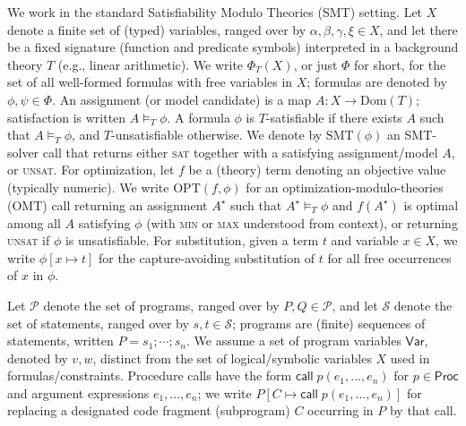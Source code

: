 \documentclass[acmsmall,screen,nonacm]{acmart}
\theoremstyle{definition}
\begin{document}
We work in the standard Satisfiability Modulo Theories (SMT) setting. Let $X$ denote a finite set of (typed) variables, ranged over by $\alpha,\beta,\gamma,\xi\in X$, and let there be a fixed signature (function and predicate symbols) interpreted in a background theory $T$ (e.g., linear arithmetic).
We write $\Phi_{T}(X)$, or just $\Phi$ for short, for the set of all well-formed formulas with free variables in $X$; formulas are denoted by $\phi,\psi\in \Phi$.
An assignment (or model candidate) is a map $A: X \to \mathrm{Dom}(T)$; satisfaction is written $A \models_T \phi$.
A formula $\phi$ is $T$-satisfiable if there exists $A$ such that $A \models_T \phi$, and $T$-unsatisfiable otherwise.
We denote by $\mathrm{SMT}(\phi)$ an SMT-solver call that returns either \textsc{sat} together with a satisfying assignment/model $A$, or \textsc{unsat}.
For optimization, let $f$ be a (theory) term denoting an objective value (typically numeric). We write $\mathrm{OPT}(f,\phi)$ for an optimization-modulo-theories (OMT) call returning an assignment $A^\star$ such that $A^\star \models_T \phi$ and $f(A^\star)$ is optimal among all $A$ satisfying $\phi$ (with \textsc{min} or \textsc{max} understood from context), or returning \textsc{unsat} if $\phi$ is unsatisfiable.
For substitution, given a term $t$ and variable $x\in X$, we write $\phi[x\mapsto t]$ for the capture-avoiding substitution of $t$ for all free occurrences of $x$ in $\phi$.

Let $\mathcal{P}$ denote the set of programs, ranged over by $P,Q\in\mathcal{P}$, and let $\mathcal{S}$ denote the set of statements, ranged over by $s,t\in\mathcal{S}$; programs are (finite) sequences of statements, written $P = s_1;\cdots;s_n$. We assume a set of program variables $\mathsf{Var}$, denoted by $v,w$, distinct from the set of logical/symbolic variables $X$ used in formulas/constraints. Procedure calls have the form $\mathsf{call}\;p(e_1, ..., e_n)$ for $p\in\mathsf{Proc}$ and argument expressions $e_1, ..., e_n$; we write $P[C \mapsto \mathsf{call}\;p(e_1, ..., e_n)]$ for replacing a designated code fragment (subprogram) $C$ occurring in $P$ by that call.
\end{document}
